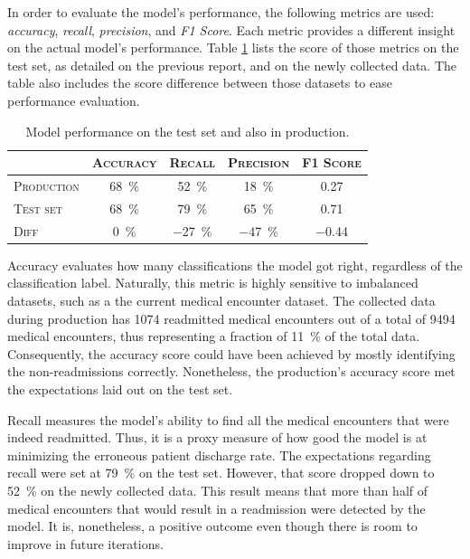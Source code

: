 \documentclass[a4paper,11pt]{article}
\begin{document}
In order to evaluate the model's performance, the following metrics are used: \textit{accuracy},  \textit{recall},  \textit{precision},  and \textit{F1 Score}.
Each metric provides a different insight on the actual model's performance. 
Table \ref{tab:model_performance} lists the score of those metrics on the test set, as detailed on the previous report, and on the newly collected data. The table also includes the score difference between those datasets to ease performance evaluation.

\begin{table}[htb]
\caption{Model performance on the test set and also in production.}
\label{tab:model_performance}
\centering
\begin{tabularx}{0.75\textwidth}{Xcccc}
\toprule
           & \textsc{Accuracy} & \textsc{Recall} & \textsc{Precision} & \textsc{F1 Score} \\
\midrule
\textsc{Production} & \SI{68}{\percent} & \SI{52}{\percent} & \SI{18}{\percent}       & \SI{0,27}{}    \\
\textsc{Test set}   & \SI{68}{\percent} & \SI{79}{\percent} & \SI{65}{\percent}        & \SI{0,71}{}     \\

\midrule
\textsc{Diff} & \SI{0}{\percent} & \SI{-27}{\percent} & \SI{-47}{\percent}       & \SI{-0,44}{}    \\
\bottomrule
\end{tabularx}
\end{table}

Accuracy evaluates how many classifications the model got right, regardless of the classification label. Naturally, this metric is highly sensitive to imbalanced datasets, such as a the current medical encounter dataset. The collected data during production has \SI{1074}{} readmitted medical encounters out of a total of \SI{9494}{} medical encounters, thus representing a fraction of \SI{11}{\percent} of the total data.
Consequently, the accuracy score could have been achieved by mostly identifying the non-readmissions correctly.
Nonetheless, the production's accuracy score met the expectations laid out on the test set.

Recall measures the model's ability to find all the medical encounters that were indeed readmitted. Thus, it is a proxy measure of how good the model is at minimizing the erroneous patient discharge rate. The expectations regarding recall were set at \SI{79}{\percent} on the test set. However, that score dropped down to \SI{52}{\percent} on the newly collected data. 
This result means that more than half of medical encounters that would result in a readmission were detected by the model. It is, nonetheless, a positive outcome even though there is room to improve in future iterations.
\end{document}

